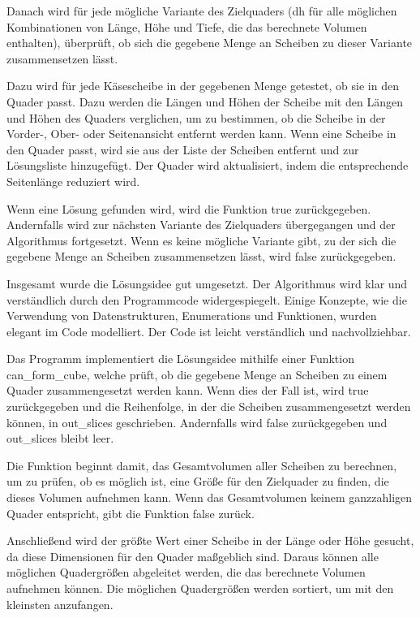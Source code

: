 \documentclass[a4paper,10pt,ngerman]{scrartcl}
\begin{document}
    Danach wird für jede mögliche Variante des Zielquaders (dh für alle möglichen Kombinationen von Länge, Höhe und Tiefe, die das berechnete Volumen enthalten), überprüft, ob sich die gegebene Menge an Scheiben zu dieser Variante zusammensetzen lässt.

    Dazu wird für jede Käsescheibe in der gegebenen Menge getestet, ob sie in den Quader passt.
    Dazu werden die Längen und Höhen der Scheibe mit den Längen und Höhen des Quaders verglichen, um zu bestimmen, ob die Scheibe in der Vorder-, Ober- oder Seitenansicht entfernt werden kann.
    Wenn eine Scheibe in den Quader passt, wird sie aus der Liste der Scheiben entfernt und zur Lösungsliste hinzugefügt.
    Der Quader wird aktualisiert, indem die entsprechende Seitenlänge reduziert wird.

    Wenn eine Lösung gefunden wird, wird die Funktion true zurückgegeben.
    Andernfalls wird zur nächsten Variante des Zielquaders übergegangen und der Algorithmus fortgesetzt.
    Wenn es keine mögliche Variante gibt, zu der sich die gegebene Menge an Scheiben zusammensetzen lässt, wird false zurückgegeben.

    Insgesamt wurde die Lösungsidee gut umgesetzt.
    Der Algorithmus wird klar und verständlich durch den Programmcode widergespiegelt.
    Einige Konzepte, wie die Verwendung von Datenstrukturen, Enumerations und Funktionen, wurden elegant im Code modelliert.
    Der Code ist leicht verständlich und nachvollziehbar.


    Das Programm implementiert die Lösungsidee mithilfe einer Funktion can_form_cube, welche prüft, ob die gegebene Menge an Scheiben zu einem Quader zusammengesetzt werden kann.
    Wenn dies der Fall ist, wird true zurückgegeben und die Reihenfolge, in der die Scheiben zusammengesetzt werden können, in out_slices geschrieben.
    Andernfalls wird false zurückgegeben und out_slices bleibt leer.

    Die Funktion beginnt damit, das Gesamtvolumen aller Scheiben zu berechnen, um zu prüfen, ob es möglich ist, eine Größe für den Zielquader zu finden, die dieses Volumen aufnehmen kann. Wenn das Gesamtvolumen keinem ganzzahligen Quader entspricht, gibt die Funktion false zurück.

    Anschließend wird der größte Wert einer Scheibe in der Länge oder Höhe gesucht, da diese Dimensionen für den Quader maßgeblich sind.
    Daraus können alle möglichen Quadergrößen abgeleitet werden, die das berechnete Volumen aufnehmen können.
    Die möglichen Quadergrößen werden sortiert, um mit den kleinsten anzufangen.
\end{document}
